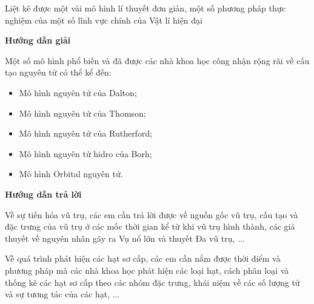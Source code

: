 \begin{dang}{Liệt kê được một vài mô hình lí thuyết đơn giản, một số phương pháp thực nghiệm của một số lĩnh vực chính của Vật lí hiện đại}
	{	\begin{center}
			\textbf{Hướng dẫn giải}
		\end{center}
		
		Một số mô hình phổ biến và đã được các nhà khoa học công nhận rộng rãi về cấu tạo nguyên tử có thể kể đến:
		\begin{itemize}
			\item Mô hình nguyên tử của Dalton;
			\item Mô hình nguyên tử của Thomson;
			\item Mô hình nguyên tử của Rutherford;
			\item Mô hình nguyên tử hidro của Borh;
			\item Mô hình Orbital nguyên tử.
		\end{itemize}
		
	}
	{	\begin{center}
			\textbf{Hướng dẫn trả lời}
		\end{center}
		
		Về sự tiến hóa vũ trụ, các em cần trả lời được về nguồn gốc vũ trụ, cấu tạo và đặc trưng của vũ trụ ở các mốc thời gian kể từ khi vũ trụ hình thành, các giả thuyết về nguyên nhân gây ra Vụ nổ lớn và thuyết Đa vũ trụ, ...
		
		Về quá trình phát hiện các hạt sơ cấp, các em cần nắm được thời điểm và phương pháp mà các nhà khoa học phát hiện các loại hạt, cách phân loại và thống kê các hạt sơ cấp theo các nhóm đặc trưng, khái niệm về các số lượng tử và sự tương tác của các hạt, ...
	}
\end{dang}